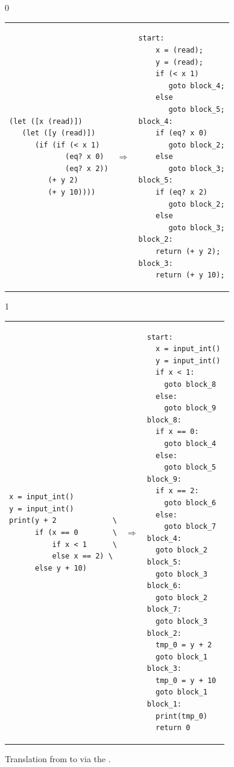 \documentclass[7x10]{TimesAPriori_MIT}%
\def\racketEd{0}
\def\pythonEd{1}
\def\edition{1}
\newcommand{\pythonColor}[0]{}
\numberwithin{theorem}{chapter}
\numberwithin{definition}{chapter}
\numberwithin{equation}{chapter}
\begin{document}
\begin{figure}[tbp]
\begin{tcolorbox}[colback=white]
{\if\edition\racketEd        
\begin{tabular}{lll}
\begin{minipage}{0.4\textwidth}
\begin{lstlisting}
(let ([x (read)])
   (let ([y (read)])
      (if (if (< x 1)
             (eq? x 0)
             (eq? x 2))
         (+ y 2)
         (+ y 10))))
\end{lstlisting}
\end{minipage}
&
$\Rightarrow$
&
\begin{minipage}{0.55\textwidth}
\begin{lstlisting}
start:
    x = (read);
    y = (read);
    if (< x 1)
       goto block_4;
    else
       goto block_5;
block_4:
    if (eq? x 0)
       goto block_2;
    else
       goto block_3;
block_5:
    if (eq? x 2)
       goto block_2;
    else
       goto block_3;
block_2:
    return (+ y 2);
block_3:
    return (+ y 10);
\end{lstlisting}
\end{minipage}
\end{tabular} 
\fi}
{\if\edition\pythonEd\pythonColor
\begin{tabular}{lll}
\begin{minipage}{0.4\textwidth}
\begin{lstlisting}
x = input_int()
y = input_int()
print(y + 2             \
      if (x == 0        \
          if x < 1      \
          else x == 2) \
      else y + 10)
\end{lstlisting}
\end{minipage}
&
$\Rightarrow$
&
\begin{minipage}{0.55\textwidth}
\begin{lstlisting}
start:
  x = input_int()
  y = input_int()
  if x < 1:
    goto block_8
  else:
    goto block_9
block_8:
  if x == 0:
    goto block_4
  else:
    goto block_5
block_9:
  if x == 2:
    goto block_6
  else:
    goto block_7
block_4:
  goto block_2
block_5:
  goto block_3
block_6:
  goto block_2
block_7:
  goto block_3
block_2:
  tmp_0 = y + 2
  goto block_1
block_3:
  tmp_0 = y + 10
  goto block_1
block_1:
  print(tmp_0)
  return 0
\end{lstlisting}
\end{minipage}
\end{tabular} 
\fi}
\end{tcolorbox}
\caption{Translation from \LangIf{} to \LangCIf{}
  via the .}
\label{fig:explicate-control-s1-38}
\end{figure}
\end{document}
